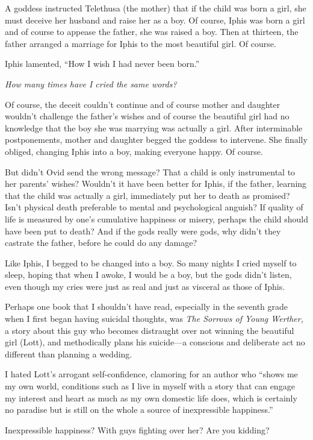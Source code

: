 A goddess instructed Telethusa (the mother) that if the child was born a
girl, she must deceive her husband and raise her as a boy. Of course,
Iphis was born a girl and of course to appease the father, she was
raised a boy. Then at thirteen, the father arranged a marriage for Iphis
to the most beautiful girl. Of course.

Iphis lamented, ``How I wish I had never been born.''

\emph{How many times have I cried the same words?}

Of course, the deceit couldn't continue and of course mother and
daughter wouldn't challenge the father's wishes and of course the
beautiful girl had no knowledge that the boy she was marrying was
actually a girl. After interminable postponements, mother and daughter
begged the goddess to intervene. She finally obliged, changing Iphis
into a boy, making everyone happy. Of course.

But didn't Ovid send the wrong message? That a child is only
instrumental to her parents' wishes? Wouldn't it have been better for
Iphis, if the father, learning that the child was actually a girl,
immediately put her to death as promised? Isn't physical death
preferable to mental and psychological anguish? If quality of life is
measured by one's cumulative happiness or misery, perhaps the child
should have been put to death? And if the gods really were gods, why
didn't they castrate the father, before he could do any damage?

Like Iphis, I begged to be changed into a boy. So many nights I cried
myself to sleep, hoping that when I awoke, I would be a boy, but the
gods didn't listen, even though my cries were just as real and just as
visceral as those of Iphis.

Perhaps one book that I shouldn't have read, especially in the seventh
grade when I first began having suicidal thoughts, was \emph{The Sorrows
of Young Werther,} a story about this guy who becomes distraught over
not winning the beautiful girl (Lott), and methodically plans his
suicide---a conscious and deliberate act no different than planning a
wedding.

I hated Lott's arrogant self-confidence, clamoring for an author who
``shows me my own world, conditions such as I live in myself with a
story that can engage my interest and heart as much as my own domestic
life does, which is certainly no paradise but is still on the whole a
source of inexpressible happiness.''

Inexpressible happiness? With guys fighting over her? Are you kidding?

